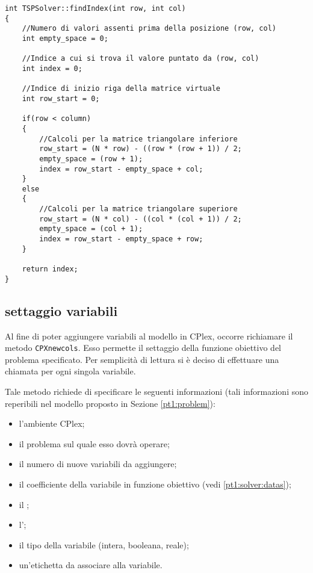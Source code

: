 \begin{lstlisting}[frame=single]
int TSPSolver::findIndex(int row, int col)
{
	//Numero di valori assenti prima della posizione (row, col)
	int empty_space = 0;
	
	//Indice a cui si trova il valore puntato da (row, col)
	int index = 0;
	
	//Indice di inizio riga della matrice virtuale
	int row_start = 0;
	
	if(row < column)
	{
		//Calcoli per la matrice triangolare inferiore
		row_start = (N * row) - ((row * (row + 1)) / 2;
		empty_space = (row + 1);
		index = row_start - empty_space + col;
	}
	else
	{
		//Calcoli per la matrice triangolare superiore
		row_start = (N * col) - ((col * (col + 1)) / 2;
		empty_space = (col + 1);
		index = row_start - empty_space + row;
	}
	
	return index;
}
\end{lstlisting}

\subsection[Settaggio variabili]{settaggio variabili}
\label{pt1:solver:variables}
Al fine di poter aggiungere variabili al modello in CPlex, occorre richiamare il metodo \texttt{CPXnewcols}. Esso permette il settaggio della funzione obiettivo del problema specificato. Per semplicità di lettura si è deciso di effettuare una chiamata per ogni singola variabile.

Tale metodo richiede di specificare le seguenti informazioni (tali informazioni sono reperibili nel modello proposto in Sezione \ref{pt1:problem}):

\begin{itemize}
\item l'ambiente CPlex;
\item il problema sul quale esso dovrà operare;
\item il numero di nuove variabili da aggiungere;
\item il coefficiente della variabile in funzione obiettivo (vedi \ref{pt1:solver:datas});
\item il ;
\item l';
\item il tipo della variabile (intera, booleana, reale);
\item un'etichetta da associare alla variabile.
\end{itemize}

